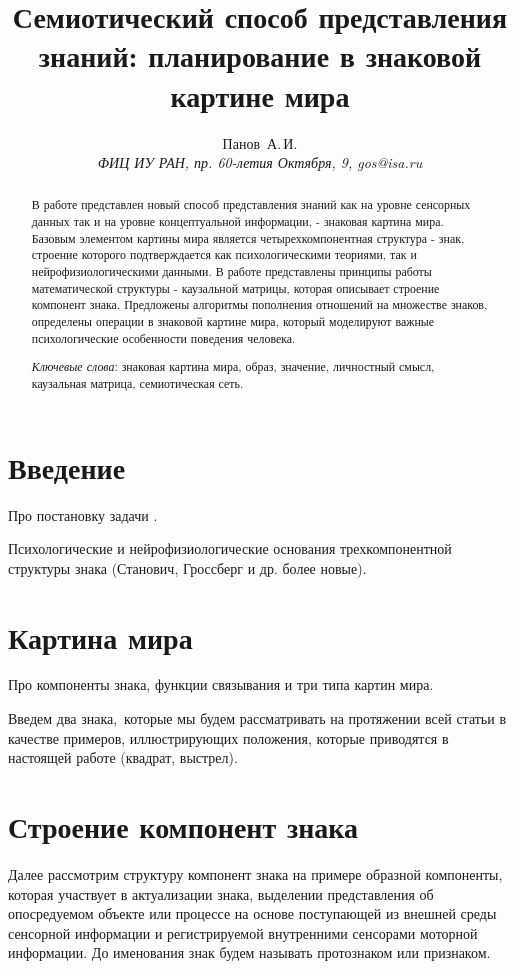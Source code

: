 \documentclass[12pt]{scrartcl}
\title{Семиотический способ представления знаний: планирование в знаковой картине мира}
\author{Панов~А.\,И.\\
	{\large\slshape ФИЦ ИУ РАН, пр. 60-летия Октября, 9, gos@isa.ru}}
\begin{document}
	
	\maketitle{}
	\begin{abstract}
		В работе представлен новый способ представления знаний как на уровне сенсорных данных так и на уровне концептуальной информации, - знаковая картина мира. Базовым элементом картины мира является четырехкомпонентная структура - знак, строение которого подтверждается как психологическими теориями, так и нейрофизиологическими данными. В работе представлены принципы работы математической структуры - каузальной матрицы, которая описывает строение компонент знака. Предложены алгоритмы пополнения отношений на множестве знаков, определены операции в знаковой картине мира, который моделируют важные психологические особенности поведения человека.
		\par\bigskip
		\textit{Ключевые слова}: знаковая картина мира, образ, значение, личностный смысл, каузальная матрица, семиотическая сеть.
	\end{abstract}
	
	
	
	\section*{Введение}
	Про постановку задачи \cite{Osipov2014c,Osipov2015d}.
	
	Психологические и нейрофизиологические основания трехкомпонентной структуры знака (Станович, Гроссберг и др. более новые).
	
	\section{Картина мира}

	Про компоненты знака, функции связывания и три типа картин мира.
	
	Введем два знака,~которые мы будем рассматривать на протяжении всей статьи в качестве примеров, иллюстрирующих положения, которые приводятся в настоящей работе (квадрат, выстрел).
	
	
	\section{Строение компонент знака}
	
	Далее рассмотрим структуру компонент знака на примере образной компоненты, которая участвует в актуализации знака, выделении представления об опосредуемом объекте или процессе на основе поступающей из внешней среды сенсорной информации и регистрируемой внутренними сенсорами моторной информации. До именования знак будем называть протознаком или признаком.
	
\end{document}
